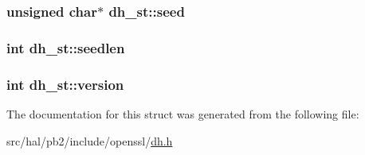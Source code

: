 \subsubsection[{\texorpdfstring{seed}{seed}}]{\setlength{\rightskip}{0pt plus 5cm}unsigned char$\ast$ dh\+\_\+st\+::seed}\hypertarget{structdh__st_ae0d5af379d1113d5d2c402f9d2d85d49}{}\label{structdh__st_ae0d5af379d1113d5d2c402f9d2d85d49}
\subsubsection[{\texorpdfstring{seedlen}{seedlen}}]{\setlength{\rightskip}{0pt plus 5cm}int dh\+\_\+st\+::seedlen}\hypertarget{structdh__st_a07d3bf5a4dcd263d27d42c92c74d42ef}{}\label{structdh__st_a07d3bf5a4dcd263d27d42c92c74d42ef}
\subsubsection[{\texorpdfstring{version}{version}}]{\setlength{\rightskip}{0pt plus 5cm}int dh\+\_\+st\+::version}\hypertarget{structdh__st_a661645628bf9785abcb0c7f19946a789}{}\label{structdh__st_a661645628bf9785abcb0c7f19946a789}


The documentation for this struct was generated from the following file\+:\begin{DoxyCompactItemize}
\item 
src/hal/pb2/include/openssl/\hyperlink{dh_8h}{dh.\+h}\end{DoxyCompactItemize}
